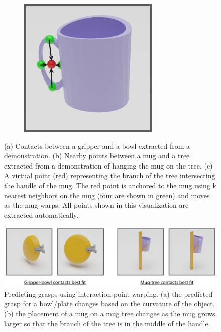 \documentclass{article}
\newcommand{\ob}[1]{\textcolor{purple}{[\textbf{OB:} #1]}}
\begin{document}
\begin{figure}
\begin{subfigure}[b]{0.25\textwidth}
        \caption{}
    \end{subfigure}
    \hspace{0.05\textwidth}
    \begin{subfigure}[b]{0.25\textwidth}
        \centering
        \includegraphics[width=\textwidth]{figures/contact_fig2.pdf}
        \caption{}
    \end{subfigure}
    \caption{(a) Contacts between a gripper and a bowl extracted from a demonstration. (b) Nearby points between a mug and a tree extracted from a demonstration of hanging the mug on the tree. (c) A virtual point (red) representing the branch of the tree intersecting the handle of the mug. The red point is anchored to the mug using k nearest neighbors on the mug (four are shown in green) and moves as the mug warps. All points shown in this visualization are extracted automatically.} %
    \label{fig:contacts}
\end{figure}

\begin{figure}
    \centering
    \includegraphics[width=\textwidth]{figures/picks_and_places.pdf}
    \caption{Predicting grasps using interaction point warping. (a) the predicted grasp for a bowl/plate changes based on the curvature of the object. (b) the placement of a mug on a mug tree changes as the mug grows larger so that the branch of the tree is in the middle of the handle.}
    \label{fig:grasps_and_placements}
\end{figure}
\end{document}
